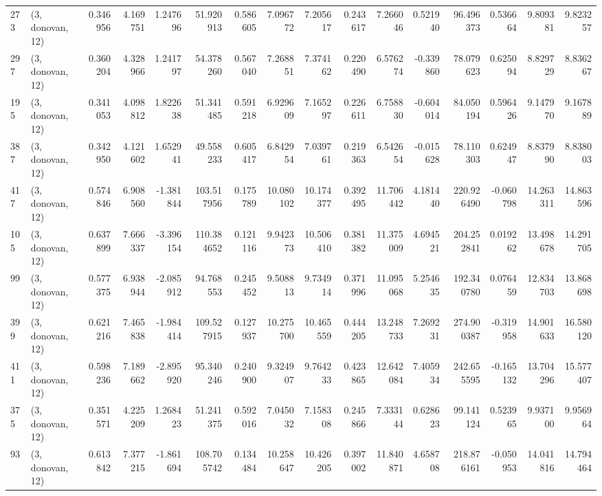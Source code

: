 \begin{tabular}{llrrrrrrrrrrrrrr}
273 &  (3, donovan, 12) &   0.346956 &   4.169751 &   1.247696 &    51.920913 &   0.586605 &   7.096772 &   7.205617 &  0.243617 &   7.266046 &   0.521940 &    96.496373 &  0.536664 &   9.809381 &   9.823257 \\
297 &  (3, donovan, 12) &   0.360204 &   4.328966 &   1.241797 &    54.378260 &   0.567040 &   7.268851 &   7.374162 &  0.220490 &   6.576274 &  -0.339860 &    78.079623 &  0.625094 &   8.829729 &   8.836267 \\
195 &  (3, donovan, 12) &   0.341053 &   4.098812 &   1.822638 &    51.341485 &   0.591218 &   6.929609 &   7.165297 &  0.226611 &   6.758830 &  -0.604014 &    84.050194 &  0.596426 &   9.147970 &   9.167889 \\
387 &  (3, donovan, 12) &   0.342950 &   4.121602 &   1.652941 &    49.558233 &   0.605417 &   6.842954 &   7.039761 &  0.219363 &   6.542654 &  -0.015628 &    78.110303 &  0.624947 &   8.837990 &   8.838003 \\
417 &  (3, donovan, 12) &   0.574846 &   6.908560 &  -1.381844 &   103.517956 &   0.175789 &  10.080102 &  10.174377 &  0.392495 &  11.706442 &   4.181440 &   220.926490 & -0.060798 &  14.263311 &  14.863596 \\
105 &  (3, donovan, 12) &   0.637899 &   7.666337 &  -3.396154 &   110.384652 &   0.121116 &   9.942373 &  10.506410 &  0.381382 &  11.375009 &   4.694521 &   204.252841 &  0.019262 &  13.498678 &  14.291705 \\
99  &  (3, donovan, 12) &   0.577375 &   6.938944 &  -2.085912 &    94.768553 &   0.245452 &   9.508813 &   9.734914 &  0.371996 &  11.095068 &   5.254635 &   192.340780 &  0.076459 &  12.834703 &  13.868698 \\
399 &  (3, donovan, 12) &   0.621216 &   7.465838 &  -1.984414 &   109.527915 &   0.127937 &  10.275700 &  10.465559 &  0.444205 &  13.248733 &   7.269231 &   274.900387 & -0.319958 &  14.901633 &  16.580120 \\
411 &  (3, donovan, 12) &   0.598236 &   7.189662 &  -2.895920 &    95.340246 &   0.240900 &   9.324907 &   9.764233 &  0.423865 &  12.642084 &   7.405934 &   242.655595 & -0.165132 &  13.704296 &  15.577407 \\
375 &  (3, donovan, 12) &   0.351571 &   4.225209 &   1.268423 &    51.241375 &   0.592016 &   7.045032 &   7.158308 &  0.245866 &   7.333144 &   0.628623 &    99.141124 &  0.523965 &   9.937100 &   9.956964 \\
93  &  (3, donovan, 12) &   0.613842 &   7.377215 &  -1.861694 &   108.705742 &   0.134484 &  10.258647 &  10.426205 &  0.397002 &  11.840871 &   4.658708 &   218.876161 & -0.050953 &  14.041816 &  14.794464 \\

\end{tabular}
